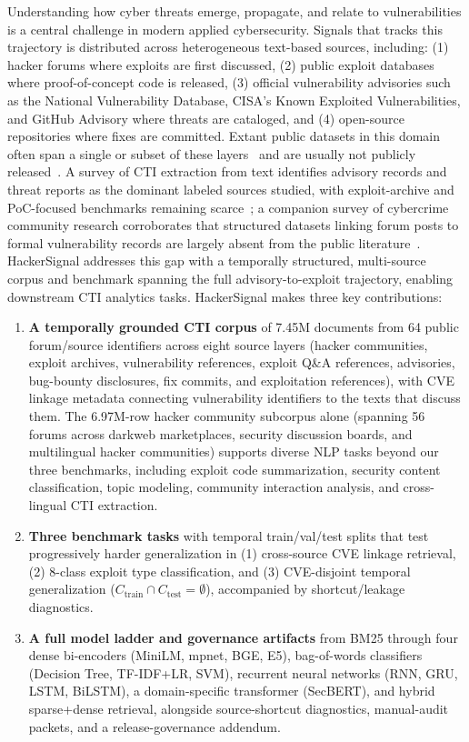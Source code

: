 \documentclass{article}
\begin{document}
Understanding how cyber threats emerge, propagate, and relate to vulnerabilities is a central challenge in modern applied cybersecurity. Signals that tracks this trajectory is distributed across heterogeneous text-based sources, including: (1) hacker forums where exploits are first discussed, (2) public exploit databases where proof-of-concept code is released, (3) official vulnerability advisories such as the National Vulnerability Database, CISA's Known Exploited Vulnerabilities, and GitHub Advisory where threats are cataloged, and (4) open-source repositories where fixes are committed. Extant public datasets in this domain often span a single or subset of these layers~\citep{crimebb2018} and are usually not publicly released~\citep{ampel2020dtl}. A survey of CTI extraction from text identifies advisory records and threat reports as the dominant labeled sources studied, with exploit-archive and PoC-focused benchmarks remaining scarce~\citep{rahman2023cti}; a companion survey of cybercrime community research corroborates that structured datasets linking forum posts to formal vulnerability records are largely absent from the public literature~\citep{hughes2024cybercrime}. HackerSignal addresses this gap with a temporally structured, multi-source corpus and benchmark spanning the full advisory-to-exploit trajectory, enabling downstream CTI analytics tasks. HackerSignal makes three key contributions:

\begin{enumerate}
  \item \textbf{A temporally grounded CTI corpus} of 7.45M documents from 64 public forum/source identifiers across eight source layers (hacker communities, exploit archives, vulnerability references, exploit Q\&A references, advisories, bug-bounty disclosures, fix commits, and exploitation references), with CVE linkage metadata connecting vulnerability identifiers to the texts that discuss them. The 6.97M-row hacker community subcorpus alone (spanning 56 forums across darkweb marketplaces, security discussion boards, and multilingual hacker communities) supports diverse NLP tasks beyond our three benchmarks, including exploit code summarization, security content classification, topic modeling, community interaction analysis, and cross-lingual CTI extraction.

  \item \textbf{Three benchmark tasks} with temporal train/val/test splits that test progressively harder generalization in (1) cross-source CVE linkage retrieval, (2) 8-class exploit type classification, and (3) CVE-disjoint temporal generalization ($C_{\text{train}} \cap C_{\text{test}} = \emptyset$), accompanied by shortcut/leakage diagnostics.

  \item \textbf{A full model ladder and governance artifacts} from BM25 through four dense bi-encoders (MiniLM, mpnet, BGE, E5), bag-of-words classifiers (Decision Tree, TF-IDF+LR, SVM), recurrent neural networks (RNN, GRU, LSTM, BiLSTM), a domain-specific transformer (SecBERT), and hybrid sparse+dense retrieval, alongside source-shortcut diagnostics, manual-audit packets, and a release-governance addendum.
\end{enumerate}
\end{document}
